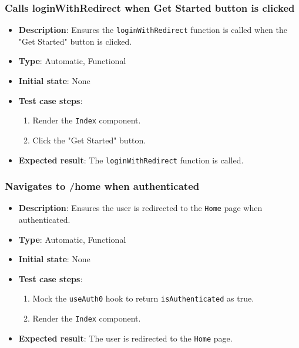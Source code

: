 \documentclass[12pt, titlepage]{article}
\begin{document}
\subsubsection{Calls loginWithRedirect when Get Started button is clicked}
\begin{itemize}
    \item \textbf{Description}: Ensures the \texttt{loginWithRedirect} function is called when the "Get Started" button is clicked.
    \item \textbf{Type}: Automatic, Functional
    \item \textbf{Initial state}: None
    \item \textbf{Test case steps}:
    \begin{enumerate}
        \item Render the \texttt{Index} component.
        \item Click the "Get Started" button.
    \end{enumerate}
    \item \textbf{Expected result}: The \texttt{loginWithRedirect} function is called.
\end{itemize}

\subsubsection{Navigates to /home when authenticated}
\begin{itemize}
    \item \textbf{Description}: Ensures the user is redirected to the \texttt{Home} page when authenticated.
    \item \textbf{Type}: Automatic, Functional
    \item \textbf{Initial state}: None
    \item \textbf{Test case steps}:
    \begin{enumerate}
        \item Mock the \texttt{useAuth0} hook to return \texttt{isAuthenticated} as true.
        \item Render the \texttt{Index} component.
    \end{enumerate}
    \item \textbf{Expected result}: The user is redirected to the \texttt{Home} page.
\end{itemize}
\end{document}
